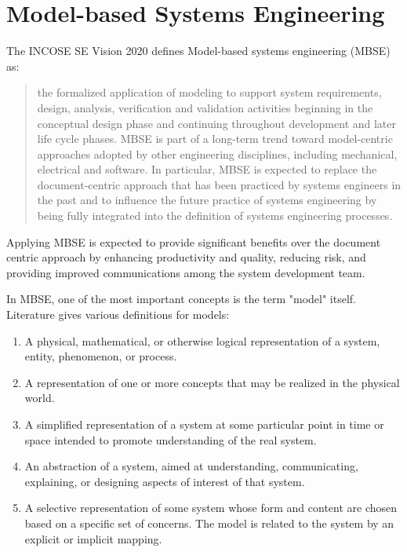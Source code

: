\section{Model-based Systems Engineering}\label{sec:mbse}

The INCOSE SE Vision 2020\cite{incose-systems-engineering-2020} defines Model-based systems engineering (MBSE) as:

\blockquote{the formalized application of modeling to support system requirements, design, analysis, verification and validation activities beginning in the conceptual design phase and continuing throughout development and later life cycle phases. MBSE is part of a long-term trend toward model-centric approaches adopted by other engineering disciplines, including mechanical, electrical and software. In particular, MBSE is expected to replace the document-centric approach that has been practiced by systems engineers in the past and to influence the future practice of systems engineering by being fully integrated into the definition of systems engineering processes.}

Applying MBSE is expected to provide significant benefits over the document centric approach by enhancing productivity and quality, reducing risk, and providing improved communications among the system development team.\cite{omgwiki}

In MBSE, one of the most important concepts is the term "model" itself. Literature gives various definitions for models:

\begin{enumerate}
	\item A physical, mathematical, or otherwise logical representation of a system, entity, phenomenon, or process.\cite{DoD_modeling_and_simulation}\label{item:dod}
	\item A representation of one or more concepts that may be realized in the physical world.\cite{sysml_practical_guide}
	\item A simplified representation of a system at some particular point in time or space intended to promote understanding of the real system.\cite{modsim}
	\item An abstraction of a system, aimed at understanding, communicating, explaining, or designing aspects of interest of that system.\cite{object-process-methodology}
	\item A selective representation of some system whose form and content are chosen based on a specific set of concerns. The model is related to the system by an explicit or implicit mapping.\cite{ORMSC/2010-09-06}
\end{enumerate}

